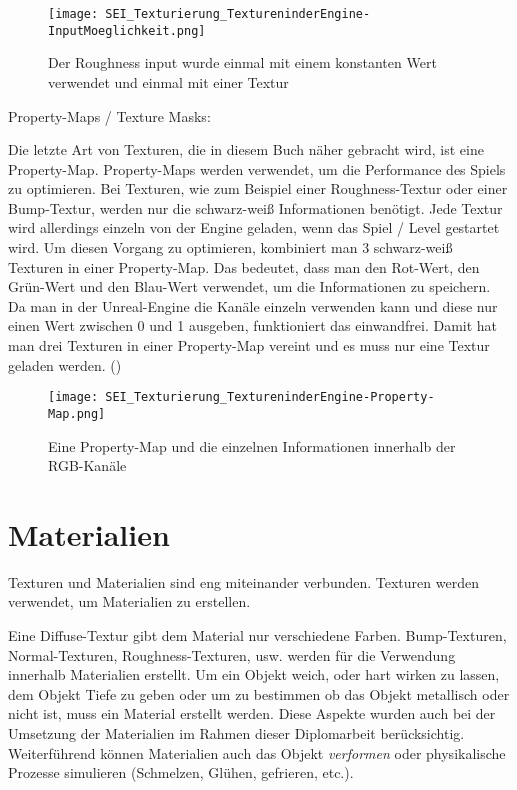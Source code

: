{\begin{figure}[H]
\centering
\texttt{[image: SEI\_Texturierung\_TextureninderEngine-InputMoeglichkeit.png]}
\caption{Der Roughness input wurde einmal mit einem konstanten Wert verwendet und einmal mit einer Textur}
\label{picture:tex_mat_roughness}
\end{figure}


Property-Maps / Texture Masks\citep{ue:tex_property_map}:

Die letzte Art von Texturen, die in diesem Buch näher gebracht wird, ist eine Property-Map. Property-Maps werden
verwendet, um die Performance des Spiels zu optimieren. Bei Texturen, wie zum Beispiel einer Roughness-Textur oder einer
Bump-Textur, werden nur die schwarz-weiß Informationen benötigt. Jede Textur wird allerdings einzeln von der Engine
geladen, wenn das Spiel / Level gestartet wird. Um diesen Vorgang zu optimieren, kombiniert man 3 schwarz-weiß Texturen
in einer Property-Map. Das bedeutet, dass man den Rot-Wert, den Grün-Wert und den Blau-Wert verwendet, um die
Informationen zu speichern. Da man in der Unreal-Engine die Kanäle einzeln verwenden kann und diese nur einen Wert
zwischen 0 und 1 ausgeben, funktioniert das einwandfrei. Damit hat man drei Texturen in einer
Property-Map vereint und es muss nur eine Textur geladen werden. ()

\begin{figure}[H]
\centering
\texttt{[image: SEI\_Texturierung\_TextureninderEngine-Property-Map.png]}
\caption{Eine Property-Map und die einzelnen Informationen innerhalb der RGB-Kanäle}
\label{picture:property_map}
\end{figure}


\section{Materialien}
\label{sec:materials}

Texturen und Materialien sind eng miteinander verbunden. Texturen werden verwendet, um Materialien zu erstellen.

Eine Diffuse-Textur gibt dem Material nur verschiedene Farben. Bump-Texturen, Normal-Texturen, Roughness-Texturen, usw.
werden für die Verwendung innerhalb Materialien erstellt. Um ein Objekt weich, oder hart wirken zu lassen, dem
Objekt Tiefe zu geben oder um zu bestimmen ob das Objekt metallisch oder nicht ist, muss ein Material erstellt werden.
Diese Aspekte wurden auch bei der Umsetzung der Materialien im Rahmen dieser Diplomarbeit berücksichtig. Weiterführend
können Materialien auch das Objekt \textit{verformen} oder physikalische Prozesse simulieren (Schmelzen, Glühen,
gefrieren, etc.).

}
